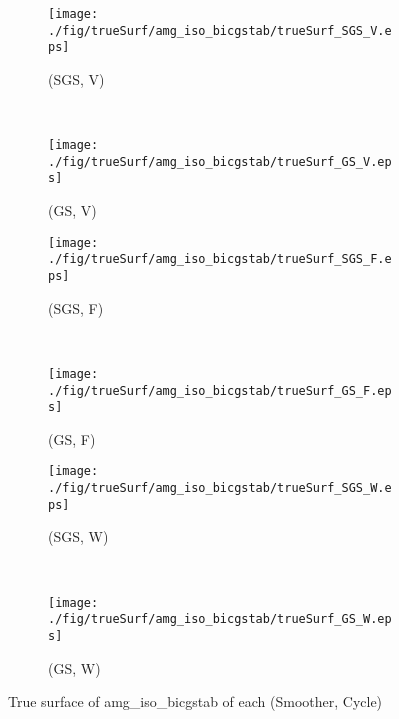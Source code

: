 \begin{figure}
  \centering
  \begin{subfigure}[h]{0.45\textwidth}
    \texttt{[image: ./fig/trueSurf/amg\_iso\_bicgstab/trueSurf\_SGS\_V.eps]}
    \caption{(SGS, V)}
  \end{subfigure}
  ~
  \begin{subfigure}[h]{0.45\textwidth}
    \texttt{[image: ./fig/trueSurf/amg\_iso\_bicgstab/trueSurf\_GS\_V.eps]}
    \caption{(GS, V)}
  \end{subfigure}
  
  \begin{subfigure}[h]{0.45\textwidth}
    \texttt{[image: ./fig/trueSurf/amg\_iso\_bicgstab/trueSurf\_SGS\_F.eps]}
    \caption{(SGS, F)}
  \end{subfigure}
  ~
  \begin{subfigure}[h]{0.45\textwidth}
    \texttt{[image: ./fig/trueSurf/amg\_iso\_bicgstab/trueSurf\_GS\_F.eps]}
    \caption{(GS, F)}
  \end{subfigure}
  
  \begin{subfigure}[h]{0.45\textwidth}
    \texttt{[image: ./fig/trueSurf/amg\_iso\_bicgstab/trueSurf\_SGS\_W.eps]}
    \caption{(SGS, W)}
  \end{subfigure}
  ~
  \begin{subfigure}[h]{0.45\textwidth}
    \texttt{[image: ./fig/trueSurf/amg\_iso\_bicgstab/trueSurf\_GS\_W.eps]}
    \caption{(GS, W)}
  \end{subfigure}
  \caption{True surface of amg\_iso\_bicgstab of each (Smoother, Cycle)}\label{fig:trueSurf_amg_iso_bicgstab}
\end{figure}

